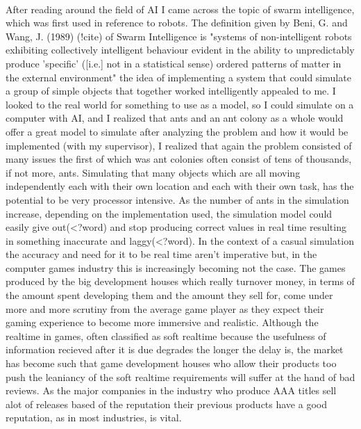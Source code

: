 \documentclass{report}
\begin{document}
\paragraph{}After reading around the field of AI I came across the topic of swarm intelligence, which was first used in reference to robots. The definition given by Beni, G. and Wang, J. (1989) (!cite) of Swarm Intelligence is "systems of non-intelligent robots exhibiting collectively intelligent behaviour evident in the ability to unpredictably produce 'specific' ([i.e.] not in a statistical sense) ordered patterns of matter in the external environment" the idea of implementing a system that could simulate a group of simple objects that together worked intelligently appealed to me. I looked to the real world for something to use as a model, so I could simulate on a computer with AI, and I realized that ants and an ant colony as a whole would offer a great model to simulate after analyzing the problem and how it would be implemented (with my supervisor), I realized that again the problem consisted of many issues the first of which was ant colonies often consist of tens of thousands, if not more, ants. Simulating that many objects which are all moving independently each with their own location and each with their own task, has the potential to be very processor intensive. As the number of ants in the simulation increase, depending on the implementation used, the simulation model could easily give out(<?word) and stop producing correct values in real time resulting in something inaccurate and laggy(<?word). In the context of a casual simulation the accuracy and need for it to be real time aren't imperative but, in the computer games industry this is increasingly becoming not the case. The games produced by the big development houses which really turnover money, in terms of the amount spent developing them and the amount they sell for, come under more and more scrutiny from the average game player as they expect their gaming experience to become more immersive and realistic. Although the realtime in games, often classified as soft realtime because the usefulness of information recieved after it is due degrades the longer the delay is, the market has become such that game development houses who allow their products too push the leaniancy of the soft realtime requirements will suffer at the hand of bad reviews. As the major companies in the industry who produce AAA titles sell alot of releases based of the reputation their previous products have a good reputation, as in most industries, is vital.
\end{document}
